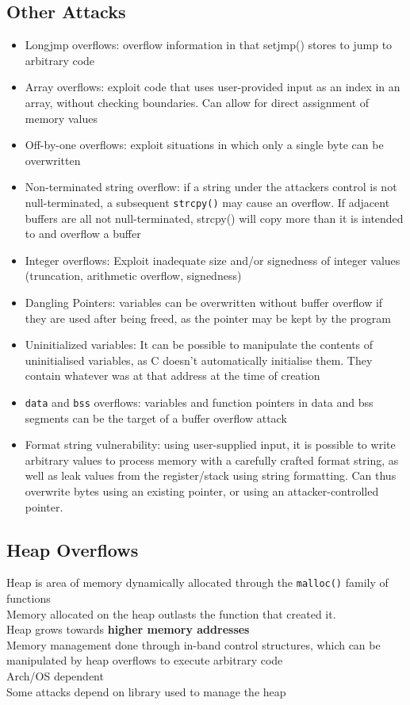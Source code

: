 \documentclass{article}
\begin{document}
\subsection{Other Attacks}
\begin{itemize}
    \item Longjmp overflows: overflow information in that setjmp() stores to jump to arbitrary code
    \item Array overflows: exploit code that uses user-provided input as an index in an array, without checking boundaries. Can allow for direct assignment of memory values
    \item Off-by-one overflows: exploit situations in which only a single byte can be overwritten
    \item Non-terminated string overflow: if a string under the attackers control is not null-terminated, a subsequent \verb|strcpy()| may cause an overflow. If adjacent buffers are all not null-terminated, strcpy() will copy more than it is intended to and overflow a buffer
    \item Integer overflows: Exploit inadequate size and/or signedness of integer values (truncation, arithmetic overflow, signedness)
    \item Dangling Pointers: variables can be overwritten without buffer overflow if they are used after being freed, as the pointer may be kept by the program
    \item Uninitialized variables: It can be possible to manipulate the contents of uninitialised variables, as C doesn't automatically initialise them. They contain whatever was at that address at the time of creation
    \item \verb|data| and \verb|bss| overflows: variables and function pointers in data and bss segments can be the target of a buffer overflow attack
    \item Format string vulnerability: using user-supplied input, it is possible to write arbitrary values to process memory with a carefully crafted format string, as well as leak values from the register/stack using string formatting. Can thus overwrite bytes using an existing pointer, or using an attacker-controlled pointer.
\end{itemize}
\subsection{Heap Overflows}
Heap is area of memory dynamically allocated through the \verb|malloc()| family of functions
\\Memory allocated on the heap outlasts the function that created it.
\\Heap grows towards \textbf{higher memory addresses}
\\Memory management done through in-band control structures, which can be manipulated by heap overflows to execute arbitrary code
\\Arch/OS dependent
\\Some attacks depend on library used to manage the heap
\end{document}
